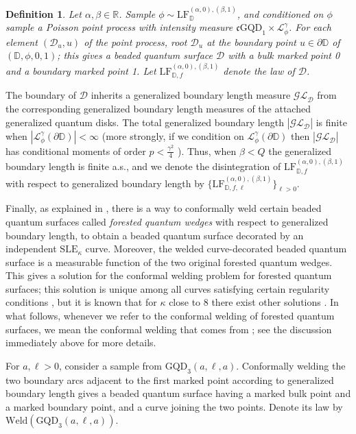 \documentclass[a4paper]{article}
\numberwithin{equation}{section}
\newcommand{\bbD}{\mathbb{D}}
\newcommand{\D}{\mathbb{D}}
\newcommand{\R}{\mathbb{R}}
\newcommand{\cD}{\mathcal{D}}
\newcommand{\cL}{\mathcal{L}}
\newcommand{\GQD}{\mathrm{GQD}}
\newcommand{\LF}{\mathrm{LF}}
\newcommand{\SLE}{\mathrm{SLE}}
\newtheorem{definition}[theorem]{Definition}
\theoremstyle{remark}
\numberwithin{equation}{section}
\begin{document}
\begin{definition}\label{def-LFf}
    Let $\alpha, \beta \in \R$. Sample $\phi \sim \LF_\bbD^{(\alpha, 0), (\beta, 1)}$, and conditioned on $\phi$ sample a Poisson point process with intensity measure $\mathfrak c \GQD_1 \times \cL_\phi^\gamma$. For each element $(\cD_u, u)$ of the point process, 
    root $\cD_u$ at the boundary point $u\in \partial \D$ of $(\D, \phi, 0, 1)$; this gives a beaded quantum surface $\cD$ with a bulk marked point 0 and a boundary marked point 1.  
    Let $\LF_{\bbD,f}^{(\alpha, 0),(\beta, 1)}$ denote the law of $\cD$.
\end{definition}
The boundary of $\cD$ inherits a  generalized boundary length measure $\mathcal{GL}_{\cD}$  from the corresponding generalized boundary length measures of the attached generalized quantum disks. The total generalized boundary length $|\mathcal{GL}_{\cD}|$ is finite when $|\cL_\phi^\gamma(\partial \D)| < \infty$ (more strongly, if we condition on $\cL_\phi^\gamma(\partial \D)$ then  $|\mathcal{GL}_{\cD}|$ has conditional moments of order $p < \frac{\gamma^2}4$ \cite[Lemma 3.2]{ahsy-nonsimple}). Thus, when $\beta < Q$ the generalized boundary length is finite a.s., and we denote the disintegration of $\LF_{\bbD,f}^{(\alpha, 0),(\beta, 1)}$ with respect to generalized boundary length by $\{\LF_{\bbD,f, \ell}^{(\alpha, 0),(\beta, 1)}\}_{\ell > 0}$.

Finally, as explained in \cite[Theorem 1.4.8]{DMS14}, there is a way to conformally weld certain beaded quantum surfaces called \emph{forested quantum wedges} with respect to generalized boundary length, to obtain a beaded quantum surface decorated by an independent $\SLE_{\kappa}$ curve. Moreover, the welded curve-decorated beaded quantum surface is a measurable function of the two original forested quantum wedges. This gives a solution for the conformal welding problem for forested quantum surfaces; this solution is unique among all curves satisfying certain regularity conditions \cite{mmq-welding}, but it is known that for $\kappa$ close to $8$ there exist other solutions \cite{lz-sierpinski}. In what follows, whenever we refer to the conformal welding of forested quantum surfaces, we mean the conformal welding that comes from \cite{DMS14}; see the discussion immediately above \cite[Theorem 1.4]{ahsy-nonsimple} for more details. 

For $a, \ell > 0$, consider a sample from $\GQD_3(a,\ell,a)$. Conformally welding the two boundary arcs adjacent to the first marked point according to generalized boundary length gives a beaded quantum surface having a marked bulk point and a marked boundary point, and a curve joining the two points. Denote its law by $\mathrm{Weld}(\GQD_{3}(a, \ell, a))$.
\end{document}
